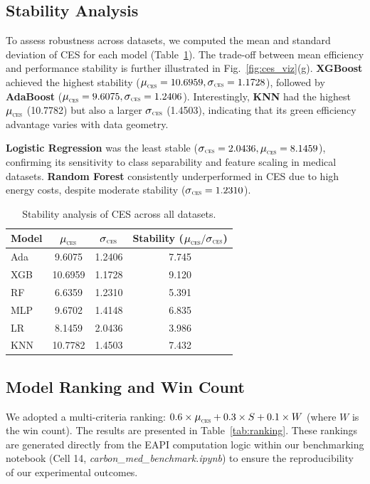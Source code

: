\documentclass[conference]{IEEEtran}
\newcommand{\muCES}{\scalebox{1.1}{$\mu$}_{\scalebox{0.5}{CES}}}
\newcommand{\sigmaCES}{\scalebox{1.1}{$\sigma$}_{\scalebox{0.5}{CES}}}
\begin{document}
\subsection{Stability Analysis}
\label{sec:stability}

To assess robustness across datasets, we computed the mean and standard deviation of CES for each model (Table~\ref{tab:stability}). The trade-off between mean efficiency and performance stability is further illustrated in Fig.~\ref{fig:ces_viz}(g). \textbf{XGBoost} achieved the highest stability ($\muCES = 10.6959, \sigmaCES = 1.1728$), followed by \textbf{AdaBoost} ($\muCES = 9.6075, \sigmaCES = 1.2406$). Interestingly, \textbf{KNN} had the highest $\muCES$ (10.7782) but also a larger $\sigmaCES$ (1.4503), indicating that its green efficiency advantage varies with data geometry.  

\textbf{Logistic Regression} was the least stable ($\sigmaCES = 2.0436, \muCES = 8.1459$), confirming its sensitivity to class separability and feature scaling in medical datasets. \textbf{Random Forest} consistently underperformed in CES due to high energy costs, despite moderate stability ($\sigmaCES = 1.2310$).

\begin{table}[htbp]
\centering
\caption{Stability analysis of CES across all datasets.}
\label{tab:stability}
\small
\setlength{\tabcolsep}{4pt}
\begin{tabular}{lccc}
\toprule
\textbf{Model} & \textbf{$\muCES$} & \textbf{$\sigmaCES$} & \textbf{Stability ($\muCES/\sigmaCES$)} \\
\midrule
Ada & 9.6075 & 1.2406 & 7.745 \\
XGB & 10.6959 & 1.1728 & 9.120 \\
RF  & 6.6359 & 1.2310 & 5.391 \\
MLP & 9.6702 & 1.4148 & 6.835 \\
LR  & 8.1459 & 2.0436 & 3.986 \\
KNN & 10.7782 & 1.4503 & 7.432 \\
\bottomrule
\end{tabular}
\end{table}

\subsection{Model Ranking and Win Count}

We adopted a multi-criteria ranking: $0.6 \times \muCES + 0.3 \times S + 0.1 \times W$ (where $W$ is the win count). The results are presented in Table~\ref{tab:ranking}. These rankings are generated directly from the EAPI computation logic within our benchmarking notebook (Cell 14, \textit{carbon\_med\_benchmark.ipynb}) to ensure the reproducibility of our experimental outcomes.
\end{document}
